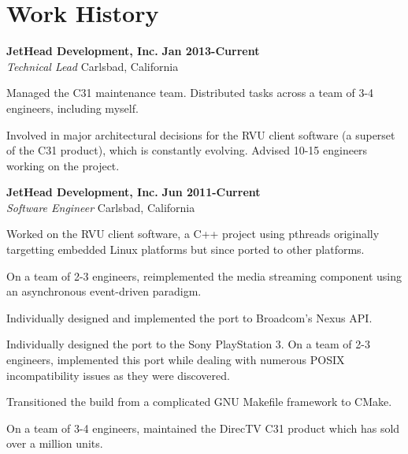 \section{Work History}
\begin{lonelist}

\item[] \textbf{JetHead Development, Inc.} \hfill \textbf{Jan 2013-Current}\\
  \textit{Technical Lead} \hfill Carlsbad, California
  \begin{innerlist}
  \item Managed the C31 maintenance team. Distributed tasks across a team of 3-4
      engineers, including myself.

  \item Involved in major architectural decisions for the RVU client software
      (a superset of the C31 product), which is constantly evolving. Advised
      10-15 engineers working on the project.
  \end{innerlist}

\item[] \textbf{JetHead Development, Inc.} \hfill \textbf{Jun 2011-Current}\\
  \textit{Software Engineer} \hfill Carlsbad, California
  \begin{innerlist}
  \item Worked on the RVU client software, a C++ project using pthreads
      originally targetting embedded Linux platforms but since ported to
      other platforms.

  \item On a team of 2-3 engineers, reimplemented the media streaming component
      using an asynchronous event-driven paradigm.

  \item Individually designed and implemented the port to Broadcom's Nexus API.

  \item Individually designed the port to the Sony PlayStation 3. On a team
      of 2-3 engineers, implemented this port while dealing with numerous
      POSIX incompatibility issues as they were discovered.

  \item Transitioned the build from a complicated GNU Makefile framework to
      CMake.

  \item On a team of 3-4 engineers, maintained the DirecTV C31 product which
      has sold over a million units.
  \end{innerlist}


\end{lonelist}

